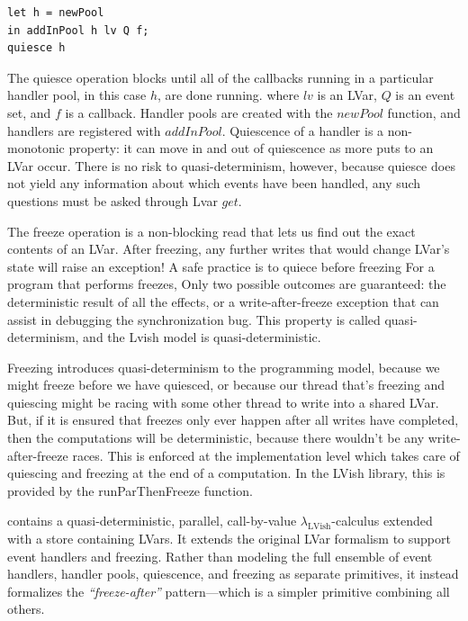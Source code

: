 \documentclass[twocolumn]{article}
\newcommand{\lambdaLVish}{\ensuremath{\lambda_{\textrm{LVish}}}}
\begin{document}
\begin{lstlisting}
let h = newPool
in addInPool h lv Q f;
quiesce h
\end{lstlisting}
The quiesce operation blocks until all of the callbacks running in a particular handler pool, in this case $h$, are done running. 
where $lv$ is an LVar, $Q$ is an event set, and $f$ is a callback. Handler pools are created with the $newPool$ function, and handlers are registered with $addInPool$. Quiescence of a handler is a non-monotonic property: it can move in and out of quiescence as more puts to an LVar occur. There is no risk to quasi-determinism, however, because quiesce does not yield any information about which events have been handled, any such questions must be asked through Lvar $get$. 

The freeze operation is a non-blocking read that lets us find out the exact contents of an LVar. After freezing, any further writes that would change LVar's state will raise an exception! A safe practice is to quiece before freezing For a program that performs freezes, Only two possible outcomes are guaranteed: the deterministic result of all the effects, or a write-after-freeze exception that can assist in debugging the synchronization bug. This property is called quasi-determinism, and the Lvish model is
quasi-deterministic.

Freezing introduces quasi-determinism to the programming model, because we might freeze before we have quiesced, or because our thread that's freezing and quiescing might be racing with some other thread to write into a shared LVar. But, if it is ensured that freezes only ever happen after all writes have completed, then the computations will be deterministic, because there wouldn't be any write-after-freeze races. This is enforced at the implementation level which takes care of quiescing and
freezing at the end of a computation. In the LVish library, this is provided by the runParThenFreeze function.

\cite{lkuper2}contains a quasi-deterministic, parallel, call-by-value $\lambdaLVish$-calculus extended with a store containing LVars. It extends the original LVar formalism to support event handlers and freezing. Rather than modeling the full ensemble of event handlers, handler pools, quiescence, and freezing as separate primitives, it instead formalizes the \emph{“freeze-after”} pattern—which is a simpler primitive combining all others.
\end{document}
